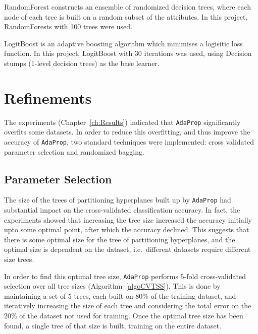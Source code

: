 \documentclass[a4paper,12pt]{report} %
\newcommand{\AdaProp}{\texttt{AdaProp}\xspace}
\begin{document}
RandomForest \cite{breiman} constructs an ensemble of 
    randomized decision trees, where each node of each tree is 
    built on a random subset of the attributes.
In this project, RandomForests with 100 trees were used.

LogitBoost \cite{friedman} is an adaptive boosting algorithm 
    which minimises a logisitic loss function.
In this project, LogitBoost with 30 iterations was used, 
    using Decision stumps (1-level decision trees) as the base learner.


\section{Refinements}

The experiments (Chapter~\ref{ch:Results}) indicated that \AdaProp 
    significantly overfits some datasets.
In order to reduce this overfitting, 
    and thus improve the accuracy of \AdaProp, 
    two standard techniques were implemented: 
    cross validated parameter selection
    and randomized bagging.


\subsection{Parameter Selection}

The size of the trees of partitioning hyperplanes 
    built up by \AdaProp had substantial impact on
    the cross-validated classification accuracy.
In fact, the experiments showed that increasing the tree
    size increased the accuracy initially upto some 
    optimal point, after which the accuracy declined.
This suggests that there is some optimal size 
    for the tree of partitioning hyperplanes,
    and the optimal size is dependent on the dataset, 
    i.e.\ different datasets require different size trees.
    
In order to find this optimal tree size, \AdaProp performs
    $5$-fold cross-validated selection over all tree sizes
    (Algorithm~\ref{algoCVTSS}).
This is done by maintaining a set of 5 trees, each built on 
    80\% of the training dataset, and iteratively increasing
    the size of each tree and considering the total error
    on the 20\% of the dataset not used for training.
Once the optimal tree size has been found, 
    a single tree of that size is built, 
    training on the entire dataset.    
\end{document}
